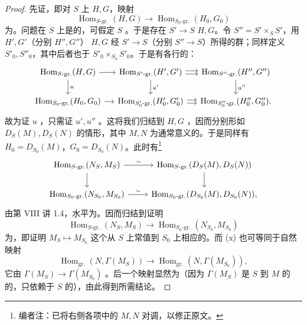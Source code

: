 \begin{proof}
先证，即对 $S$ 上 $H,G$，映射
\[
\operatorname{Hom}_{S\text{-gr.}}(H,G)\longrightarrow
\operatorname{Hom}_{S_0\text{-gr.}}(H_0,G_0)
\]
为。问题在 $S$ 上是的，可假定 $S$ 。于是存在 $S'\to S$  $H,G$。令 $S''=S'\times_S S'$，用 $H',G'$（分别 $H'',G''$） $H,G$ 经 $S'\to S$（分别 $S''\to S$）所得的群；同样定义 $S'_0,S''_0$，其中后者也于 $S'_0\times_{S_0}S'_0$。于是有各行的：
\[
\begin{tikzcd}[column sep=small]
\operatorname{Hom}_{S\text{-gr.}}(H,G)\arrow[r]\arrow[d,"u"] &
\operatorname{Hom}_{S'\text{-gr.}}(H',G')\arrow[r,shift left=.45ex]\arrow[r,shift right=.45ex]\arrow[d,"u'"] &
\operatorname{Hom}_{S''\text{-gr.}}(H'',G'')\arrow[d,"u''"]\\
\operatorname{Hom}_{S_0\text{-gr.}}(H_0,G_0)\arrow[r]&
\operatorname{Hom}_{S'_0\text{-gr.}}(H'_0,G'_0)\arrow[r,shift left=.45ex]\arrow[r,shift right=.45ex]&
\operatorname{Hom}_{S''_0\text{-gr.}}(H''_0,G''_0).
\end{tikzcd}
\]
故为证 $u$ ，只需证 $u',u''$ 。这将我们归结到 $H,G$ ，因而分别形如 $D_S(M),D_S(N)$ 的情形，其中 $M,N$ 为通常意义的。于是同样有 $H_0=D_{S_0}(M)$，$G_0=D_{S_0}(N)$。此时有\footnote[7]{编者注：已将右侧各项中的 $M,N$ 对调，以修正原文。}
\[
\begin{tikzcd}
\operatorname{Hom}_{S\text{-gr.}}(N_S,M_S)\arrow[r,"\sim"]\arrow[d]&
\operatorname{Hom}_{S\text{-gr.}}(D_S(M),D_S(N))\arrow[d]\\
\operatorname{Hom}_{S_0\text{-gr.}}(N_{S_0},M_{S_0})\arrow[r,"\sim"]&
\operatorname{Hom}_{S_0\text{-gr.}}(D_{S_0}(M),D_{S_0}(N)),
\end{tikzcd}
\]
由第 VIII 讲 1.4，水平为。因而归结到证明
\[
\operatorname{Hom}_{S\text{-gr.}}(N_S,M_S)\longrightarrow
\operatorname{Hom}_{S_0\text{-gr.}}(N_{S_0},M_{S_0})\tag{x}
\]
为，即证明 $M_S\mapsto M_{S_0}$ 这个从 $S$ 上常值到 $S_0$ 上相应的。而 (x) 也可等同于自然映射
\[
\operatorname{Hom}_{\mathrm{gr.}}(N,\Gamma(M_S))\longrightarrow
\operatorname{Hom}_{\mathrm{gr.}}(N,\Gamma(M_{S_0})),
\]
它由 $\Gamma(M_S)\to\Gamma(M_{S_0})$ 。后一个映射显然为（因为 $\Gamma(M_S)$ 是 $S$ 到 $M$ 的的，只依赖于 $S$ 的），由此得到所需结论。


\end{proof}
